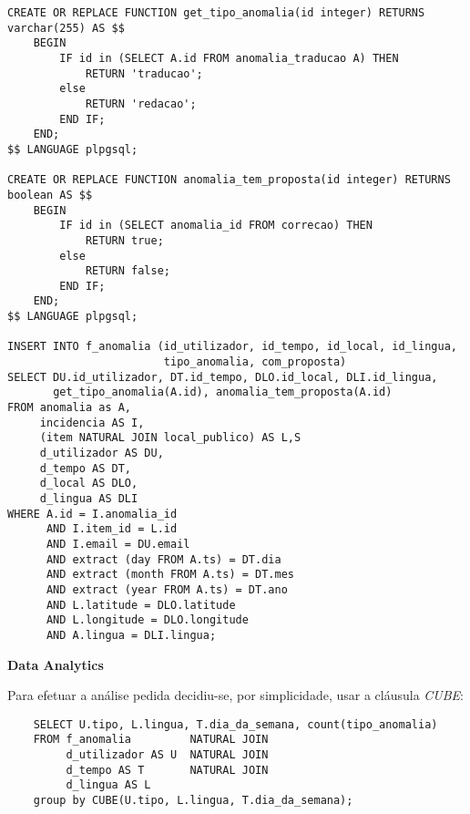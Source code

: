 \documentclass[12pt]{report}
\begin{document}
\begin{verbatim}
CREATE OR REPLACE FUNCTION get_tipo_anomalia(id integer) RETURNS varchar(255) AS $$
    BEGIN
        IF id in (SELECT A.id FROM anomalia_traducao A) THEN
            RETURN 'traducao';
        else
            RETURN 'redacao';
        END IF;
    END;
$$ LANGUAGE plpgsql;

CREATE OR REPLACE FUNCTION anomalia_tem_proposta(id integer) RETURNS boolean AS $$
    BEGIN
        IF id in (SELECT anomalia_id FROM correcao) THEN
            RETURN true;
        else
            RETURN false;
        END IF;
    END;
$$ LANGUAGE plpgsql;

INSERT INTO f_anomalia (id_utilizador, id_tempo, id_local, id_lingua,
                        tipo_anomalia, com_proposta)
SELECT DU.id_utilizador, DT.id_tempo, DLO.id_local, DLI.id_lingua,
       get_tipo_anomalia(A.id), anomalia_tem_proposta(A.id)
FROM anomalia as A,
     incidencia AS I,
     (item NATURAL JOIN local_publico) AS L,S
     d_utilizador AS DU,
     d_tempo AS DT,
     d_local AS DLO,
     d_lingua AS DLI
WHERE A.id = I.anomalia_id
      AND I.item_id = L.id
      AND I.email = DU.email
      AND extract (day FROM A.ts) = DT.dia
      AND extract (month FROM A.ts) = DT.mes
      AND extract (year FROM A.ts) = DT.ano
      AND L.latitude = DLO.latitude
      AND L.longitude = DLO.longitude
      AND A.lingua = DLI.lingua;
    \end{verbatim}


    \Large
    \textbf{Data Analytics}\\
    \normalsize
    \par Para efetuar a análise pedida decidiu-se, por simplicidade, usar a cláusula \textit{CUBE}:
    \footnotesize \begin{verbatim}
    SELECT U.tipo, L.lingua, T.dia_da_semana, count(tipo_anomalia)
    FROM f_anomalia         NATURAL JOIN
         d_utilizador AS U  NATURAL JOIN
         d_tempo AS T       NATURAL JOIN
         d_lingua AS L
    group by CUBE(U.tipo, L.lingua, T.dia_da_semana);
    \end{verbatim}\normalsize
\end{document}
